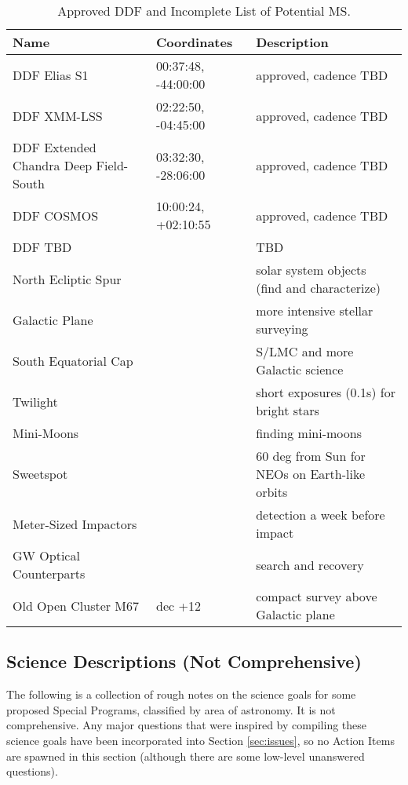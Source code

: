 \documentclass[DM,lsstdraft,toc]{lsstdoc}
\begin{document}
\begin{table}[h]
\begin{center}
\begin{footnotesize}
\caption{Approved DDF and Incomplete List of Potential MS.}
\label{tab:ddfms}
\begin{tabular}{lll}
\hline \hline
Name & Coordinates & Description  \\
\hline
DDF Elias S1    & 00:37:48, -44:00:00  & approved, cadence TBD \\
DDF XMM-LSS & 02:22:50, -04:45:00  & approved, cadence TBD  \\
DDF Extended Chandra Deep Field-South & 03:32:30, -28:06:00  & approved, cadence TBD  \\
DDF COSMOS  & 10:00:24, +02:10:55 & approved, cadence TBD  \\
DDF TBD  & & TBD \\
North Ecliptic Spur      & & solar system objects (find and characterize) \\
Galactic Plane             & & more intensive stellar surveying \\
South Equatorial Cap  & & S/LMC and more Galactic science \\
Twilight                        & & short exposures (0.1s) for bright stars \\
Mini-Moons                     &  & finding mini-moons \\
Sweetspot                       & & 60 deg from Sun for NEOs on Earth-like orbits \\
Meter-Sized Impactors     & & detection a week before impact \\
GW Optical Counterparts & & search and recovery \\
Old Open Cluster M67      & dec +12 & compact survey above Galactic plane  \\
\hline
\end{tabular}
\end{footnotesize}
\end{center}
\end{table}

\subsection{Science Descriptions (Not Comprehensive)}\label{ssec:science_descriptions}

The following is a collection of rough notes on the science goals for some proposed Special Programs, classified by area of astronomy. It is not comprehensive. Any major questions that were inspired by compiling these science goals have been incorporated into Section \ref{sec:issues}, so no Action Items are spawned in this section (although there are some low-level unanswered questions).
\end{document}
